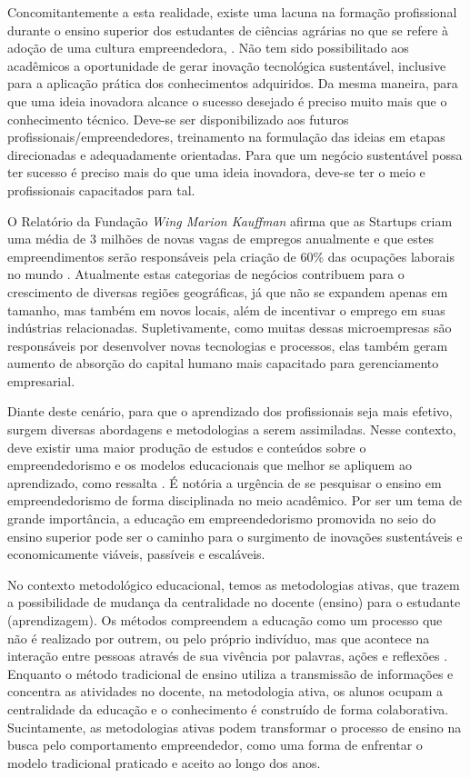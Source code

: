 Concomitantemente a esta realidade, existe uma lacuna na formação profissional durante o ensino superior dos estudantes de ciências agrárias no que se refere à adoção de uma cultura empreendedora, \cite{araujo_educacao_2019}. Não tem sido possibilitado aos acadêmicos a oportunidade de gerar inovação tecnológica sustentável, inclusive para a aplicação prática dos conhecimentos adquiridos. Da mesma maneira, para que uma ideia inovadora alcance o sucesso desejado é preciso muito mais que o conhecimento técnico. Deve-se ser disponibilizado aos futuros profissionais/empreendedores, treinamento na formulação das ideias em etapas direcionadas e adequadamente orientadas. Para que um negócio sustentável possa ter sucesso é preciso mais do que uma ideia inovadora, deve-se ter o meio e profissionais capacitados para tal. 


O Relatório da Fundação \textit{Wing Marion Kauffman} afirma que as Startups criam uma média de 3 milhões de novas vagas de empregos anualmente e que estes empreendimentos serão responsáveis pela criação de 60\% das ocupações laborais no mundo \cite{brasil_neto_resistencia_2017}. Atualmente estas categorias de negócios contribuem para o crescimento de diversas regiões geográficas, já que não se expandem apenas em tamanho, mas também em novos locais, além de incentivar o emprego em suas indústrias relacionadas. Supletivamente, como muitas dessas microempresas são responsáveis por desenvolver novas tecnologias e processos, elas também geram aumento de absorção do capital humano mais capacitado para gerenciamento empresarial.


Diante deste cenário, para que o aprendizado dos profissionais seja mais efetivo, surgem diversas abordagens e metodologias a serem assimiladas. Nesse contexto, deve existir uma maior produção de estudos e conteúdos sobre o empreendedorismo e os modelos educacionais que melhor se apliquem ao aprendizado, como ressalta . É notória a urgência de se pesquisar o ensino em empreendedorismo de forma disciplinada no meio acadêmico. Por ser um tema de grande importância, a educação em empreendedorismo promovida no seio do ensino superior pode ser o caminho para o surgimento de inovações sustentáveis e economicamente viáveis, passíveis e escaláveis.

No contexto metodológico educacional, temos as metodologias ativas, que trazem a possibilidade de mudança da centralidade no docente (ensino) para o estudante (aprendizagem). Os métodos compreendem a educação como um processo que não é realizado por outrem, ou pelo próprio indivíduo, mas que acontece na interação entre pessoas através de sua vivência por palavras, ações e reflexões \cite{paiva_metodologias_2016}. Enquanto o método tradicional de ensino utiliza a transmissão de informações e concentra as atividades no docente, na metodologia ativa, os alunos ocupam a centralidade da educação e o conhecimento é construído de forma colaborativa. Sucintamente, as metodologias ativas podem transformar o processo de ensino na busca pelo comportamento empreendedor, como uma forma de enfrentar o modelo tradicional praticado e aceito ao longo dos anos.
 
